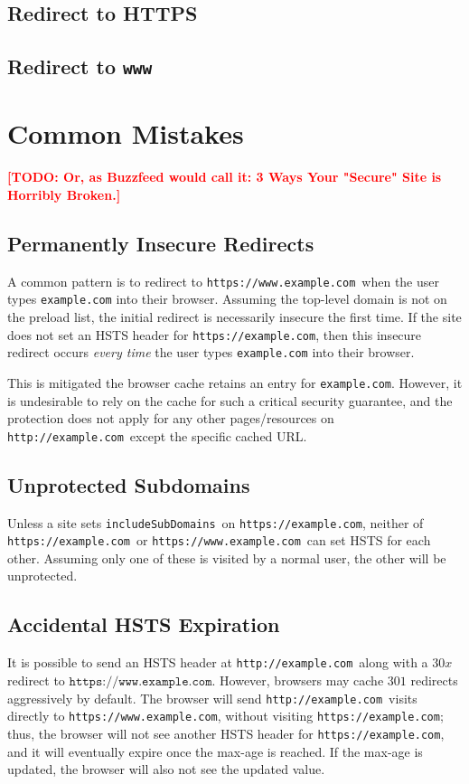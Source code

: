 \documentclass[conference]{./IEEEtran}
\newcommand{\todo}[1]{\textcolor{red}{\textbf{[TODO: #1]}}}
\newcommand{\site}[1]{\texttt{#1}}
\newcommand{\code}[1]{\texttt{#1}}
\newcommand{\iSD}{{\code{includeSubDomains}}}
\newcommand{\genericsite}{example.com}
\newcommand{\h}{{\site{http://\genericsite}}}
\newcommand{\s}{{\site{https://\genericsite}}}
\newcommand{\sw}{{\site{https://www.\genericsite}}}
\theoremstyle{plain}
\begin{document}
\subsection{Redirect to HTTPS}

\subsection{Redirect to \code{www}}

\section{Common Mistakes}
\todo{Or, as Buzzfeed would call it: 3 Ways Your "Secure" Site is Horribly Broken.}

\subsection{Permanently Insecure Redirects}

A common pattern is to redirect to \sw~when the user types \site{\genericsite} into their browser. Assuming the top-level domain is not on the preload list, the initial redirect is necessarily insecure the first time. If the site does not set an HSTS header for \s, then this insecure redirect occurs \emph{every time} the user types \site{\genericsite} into their browser.

This is mitigated the browser cache retains an entry for \site{\genericsite}. However, it is undesirable to rely on the cache for such a critical security guarantee, and the protection does not apply for any other pages/resources on \h~except the specific cached URL.

\subsection{Unprotected Subdomains}

Unless a site sets \iSD~on \s, neither of \s~or \sw~can set HSTS for each other. Assuming only one of these is visited by a normal user, the other will be unprotected.

\subsection{Accidental HSTS Expiration}

It is possible to send an HSTS header at \h~along with a $30x$ redirect to $\sw$. However, browsers may cache $301$ redirects  aggressively by default. The browser will send \h~visits directly to \sw, without visiting \s; thus, the browser will not see another HSTS header for \s, and it will eventually expire once the max-age is reached. If the max-age is updated, the browser will also not see the updated value.
\end{document}
